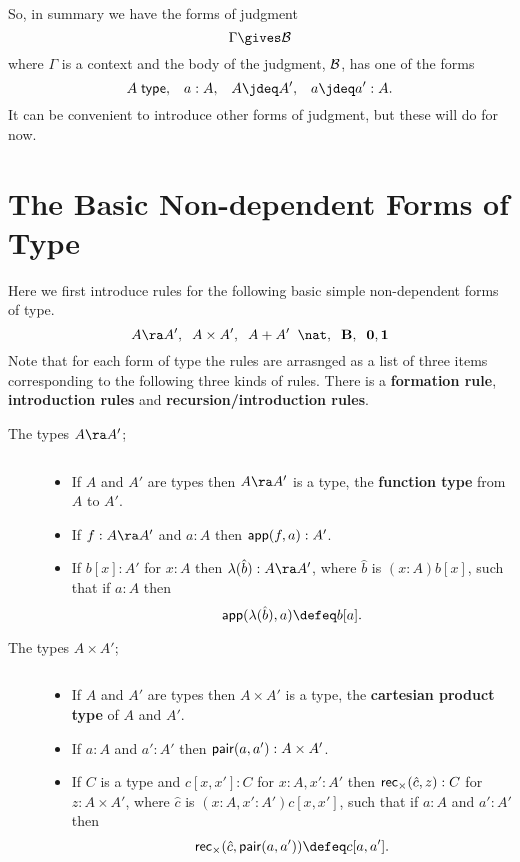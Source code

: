 {{So, in summary we have the forms of judgment
  \[\Gamma\gives\cal B\]
where $\Gamma$ is a context and the body of the judgment, $\cal B$, has one of the forms 
  \[ A\stype,\;\;\; a:A,\;\;\; A\jdeq A',\;\;\; a\jdeq a':A.\]
It can be convenient to introduce other forms of judgment, but these will do for now.

\section{The Basic Non-dependent Forms of Type}
Here we first introduce rules for the following basic simple non-dependent forms of type.
  \[ A\ra A',\;\; A\times A',\;\; A+A'\;\; \nat,\;\; \bool,\;\;\emptyt,\unitt\] 
Note that for each form of type the rules are arrasnged as a list of three items corresponding to the following three kinds of rules.  There is a
{\bf formation rule}, {\bf introduction rules} and {\bf recursion/introduction rules}.
\begin{description}
\item[The types $A\ra A'$;] $\;$
\begin{itemize}
\item If $A$ and $A'$ are types then $A\ra A'$ is a type, the {\bf function type} from $A$ to $A'$.
\item If $f:A\ra A'$ and $a:A$ then ${\sf app}(f,a):A'$.
\item If $b[x]:A'$ for $x:A$ then $\lambda(\hat{b}):A\ra A'$,
where $\hat{b}$ is $(x:A)b[x]$,
such that if $a:A$ then
  \[ \app(\lambda(\hat{b}),a)\defeq b[a].\]
\end{itemize}

\item[The types $A\times A'$;] $\;$
\begin{itemize}
\item If $A$ and $A'$ are types then $A\times A'$ is a type, the {\bf cartesian product type} of $A$ and $A'$.
\item If $a:A$ and $a':A'$ then ${\sf pair}(a,a'):A\times A'$.
\item If $C$ is a type and $c[x,x']:C$ for $x:A,x':A'$ then ${\sf rec}_\times(\hat{c},z):C$ for $z:A\times A'$, where $\hat{c}$ is $(x:A,x':A')c[x,x']$, such that
if $a:A$ and $a':A'$ then
  \[ \rec_\times(\hat{c},\pair(a,a'))\defeq c[a,a'].\]
\end{itemize}


\end{description}}}
